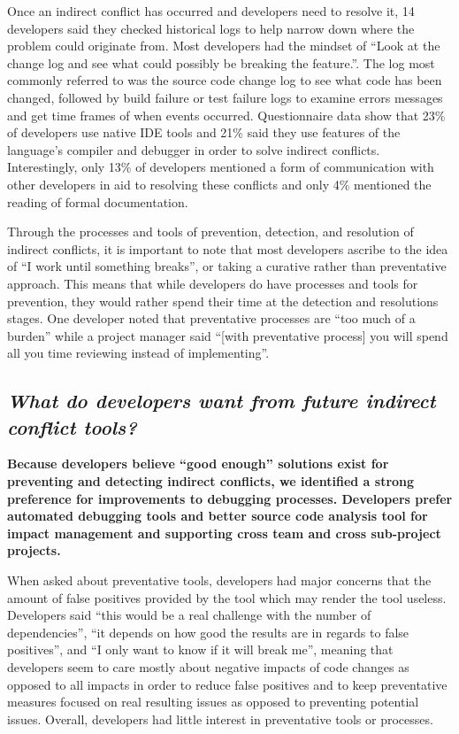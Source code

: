 \documentclass[conference]{IEEEtran}
\begin{document}
Once an indirect conflict has occurred and developers need to resolve it, 14 developers said
they checked historical logs to help narrow down where the problem could originate from. Most developers had the mindset of
``Look at the change log and see what could possibly be breaking the feature.''. The log most commonly referred to was the source
code change log to see what code has been changed, followed by build failure or test failure logs to examine errors messages and get time
frames of when events occurred. Questionnaire data show that 23\% of developers use native IDE tools and 21\% said they use
features of the language's compiler and debugger in order to solve indirect conflicts. Interestingly, only 13\% of developers
mentioned a form of communication with other developers in aid to resolving these conflicts and only 4\% mentioned the reading
of formal documentation.

Through the processes and tools of prevention, detection, and resolution of indirect conflicts, it is important to note that
most developers ascribe to the idea of ``I work until something breaks'', or taking a curative rather than preventative
approach. This means that while developers do have processes and tools for prevention, they would rather spend their time
at the detection and resolutions stages. One developer noted that preventative processes are ``too much of a burden''
while a project manager said ``[with preventative process] you will spend all you time reviewing instead of implementing''.

{}
\subsection*{ \it{What do developers want from future indirect conflict tools?}}

\bf{Because developers believe ``good enough'' solutions exist for preventing and detecting indirect conflicts, we identified a strong preference for improvements to debugging processes. Developers prefer automated debugging tools
and better source code analysis tool for impact management and supporting cross team and cross sub-project projects.}

\normalfont{}

When asked about preventative tools, developers had major concerns that the amount of false positives
provided by the tool which may render the tool useless. Developers said ``this would
be a real challenge with the number of dependencies'', ``it depends on how
good the results are in regards to false positives'', and ``I only want to know if it will break me'', meaning that
developers seem to care mostly about negative impacts of code changes as opposed to all impacts in order to reduce
false positives and to keep preventative measures focused on real resulting issues as opposed to preventing potential
issues. Overall, developers had little interest in preventative tools or processes.
\end{document}
